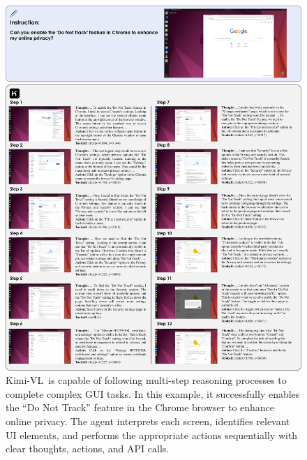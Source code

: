 \documentclass{article}
\newcommand{\ourname}{{Kimi-VL}}
\begin{document}
\begin{figure}
    \centering
    \includegraphics[width=1.0\linewidth]{figures/case_agent_1.pdf}
    \caption{\ourname~is capable of following multi-step reasoning processes to complete complex GUI tasks. In this example, it successfully enables the “Do Not Track” feature in the Chrome browser to enhance online privacy. The agent interprets each screen, identifies relevant UI elements, and performs the appropriate actions sequentially with clear thoughts, actions, and API calls. }
    \label{fig:outline}
\end{figure}
\end{document}

